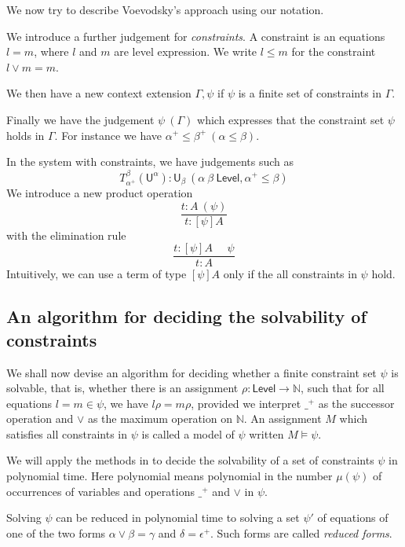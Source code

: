 \documentclass[11pt,a4paper]{article}
\def\UU{\mathsf{U}}
\def\Level{\mathsf{Level}}
\def\Constraint{\mathsf{Constraint}}
\begin{document}
We now try to describe Voevodsky's approach \cite{VV} using our notation.

We introduce a further judgement for {\em constraints}. A constraint is
an equations $l = m$, where $l$ and $m$ are level expression.
We write $l\leqslant m$ for the constraint $l\vee m = m$.

We then have a new context extension $\Gamma,\psi$ if $\psi$ is a finite set of constraints in $\Gamma$.

Finally we have the judgement $\psi~(\Gamma)$ which expresses that the constraint set $\psi$
holds in $\Gamma$. For instance we have $\alpha^+\leqslant\beta^+~(\alpha\leqslant\beta)$.

In the system with constraints, we have judgements such as
$$
T_{\alpha^+}^{\beta}(\UU^{\alpha}):\UU_{\beta}~(\alpha~\beta~\Level,\alpha^+\leqslant\beta)
$$
We introduce a new product operation
$$
\frac{t:A~(\psi)}{t:[\psi]A}
$$
with the elimination rule
$$
\frac{t:[\psi]A~~~~~~\psi}{t:A}
$$
Intuitively, we can use a term of type $[\psi]A$ only if the all constraints in $\psi$ hold.

\subsection{An algorithm for deciding the solvability of constraints}

We shall now devise an algorithm for deciding whether a finite constraint set $\psi$ is solvable, that is, whether there is an assignment $\rho : \Level \to \mathbb{N}$, such that for all equations $l = m \in \psi$, we have $l\rho = m\rho$, provided we interpret $\_^+$ as the successor operation and $\vee$ as the maximum operation on $\mathbb{N}$. An assignment $M$ which satisfies all constraints in $\psi$ is called a model of $\psi$ written $M \models \psi$.

We will apply the methods in \cite{BNR08} to decide
the solvability of a set of constraints $\psi$ in polynomial time.
Here polynomial means polynomial in the number $\mu(\psi)$ of occurrences of
variables and operations $\_^+$ and $\vee$ in  $\psi$. 


Solving  $\psi$ can be reduced in polynomial time to solving a set  $\psi'$ of
equations of one of the two forms $\alpha\vee\beta = \gamma$
and $\delta = \epsilon^+$. Such forms are called \emph{reduced forms}.
\end{document}
